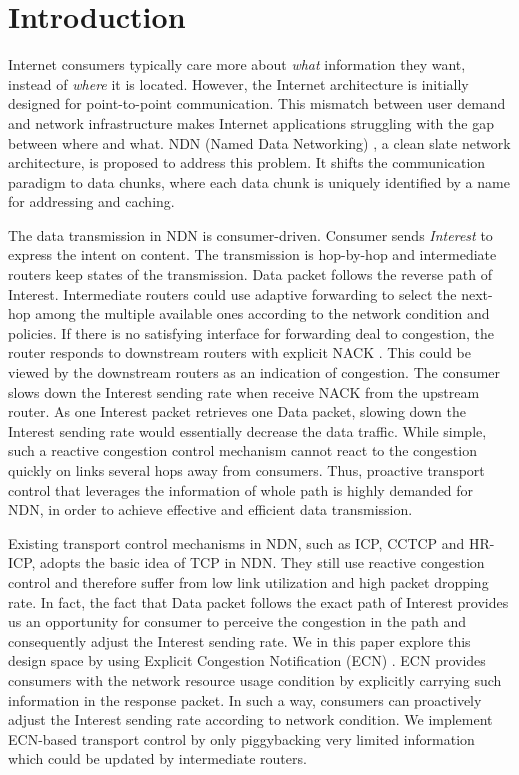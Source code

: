 
\section{Introduction}

Internet consumers typically care more about \emph{what} information they want, instead of \emph{where} it is located. However, the Internet architecture is initially designed for point-to-point communication. This mismatch between user demand and network infrastructure makes Internet applications struggling with the gap between where and what. NDN (Named Data Networking) \cite{NDN}, a clean slate network architecture, is proposed to address this problem. It shifts the communication paradigm to data chunks, where each data chunk is uniquely identified by a name for addressing and caching.

The data transmission in NDN is consumer-driven. Consumer sends \emph{Interest} to express the intent on content. The transmission is hop-by-hop and intermediate routers keep states of the transmission. Data packet follows the reverse path of Interest. Intermediate routers could use adaptive forwarding \cite{Adaptive} to select the next-hop among the multiple available ones according to the network condition and policies. If there is no satisfying interface for forwarding deal to congestion, the router responds to downstream routers with explicit NACK \cite{Adaptive}. This could be viewed by the downstream routers as an indication of congestion. The consumer slows down the Interest sending rate when receive NACK from the upstream router. As one Interest packet retrieves one Data packet, slowing down the Interest sending rate would essentially decrease the data traffic. While simple, such a reactive congestion control mechanism cannot react to the congestion quickly on links several hops away from consumers. Thus, proactive transport control that leverages the information of whole path is highly demanded for NDN, in order to achieve effective and efficient data transmission.

Existing transport control mechanisms in NDN, such as ICP\cite{ICP}, CCTCP\cite{CCTCP} and HR-ICP\cite{shape}, adopts the basic idea of TCP in NDN. They still use reactive congestion control and therefore suffer from low link utilization and high packet dropping rate. In fact, the fact that Data packet follows the exact path of Interest provides us an opportunity for consumer to perceive the congestion in the path and consequently adjust the Interest sending rate. We in this paper explore this design space by using Explicit Congestion Notification (ECN) \cite{XCP}. ECN provides consumers with the network resource usage condition by explicitly carrying such information in the response packet. In such a way, consumers can proactively adjust the Interest sending rate according to network condition. We implement ECN-based transport control by only piggybacking very limited information which could be updated by intermediate routers.

